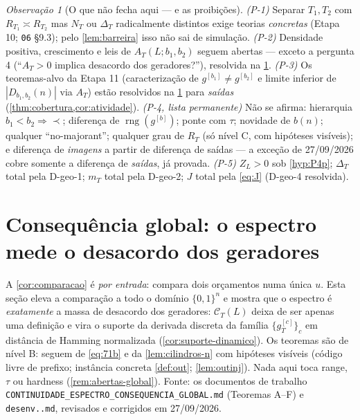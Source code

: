 \documentclass[11pt,a4paper]{article}
\theoremstyle{definition}
\theoremstyle{remark}
\newtheorem*{remark}{Observação}
\begin{document}
\begin{remark}[O que não fecha aqui --- e as proibições]\label{rem:abertas-geom}
\emph{(P-1)} Separar $T_1, T_2$ com $R_{T_1} \asymp R_{T_2}$ mas $N_T$
ou $\Delta_T$ radicalmente distintos exige teorias \emph{concretas}
(Etapa 10; \texttt{06} §9.3); pelo \cref{lem:barreira} isso não sai de
simulação. \emph{(P-2)} Densidade positiva, crescimento e leis de
$A_T(L;b_1,b_2)$ seguem abertas --- exceto a pergunta 4 (``$A_T > 0$
implica desacordo dos geradores?''), resolvida na
\cref{sec:consequencia}. \emph{(P-3)} Os teoremas-alvo da Etapa 11
(caracterização de $g^{[b_1]} \neq g^{[b_2]}$ e limite inferior de
$|D_{b_1,b_2}(n)|$ via $A_T$) estão resolvidos na
\cref{sec:consequencia} para \emph{saídas}
(\cref{thm:cobertura,cor:atividade}). \emph{(P-4, lista permanente)}
Não se afirma: hierarquia $b_1 < b_2 \Rightarrow \prec$; diferença de
$\operatorname{rng}(g^{[b]})$; ponte com $\tau$; novidade de $b(n)$;
qualquer ``no-majorant''; qualquer grau de $R_T$ (só nível C, com
hipóteses visíveis); e diferença de \emph{imagens} a partir de
diferença de saídas --- a exceção de 27/09/2026 cobre somente a
diferença de \emph{saídas}, já provada. \emph{(P-5)} $Z_L > 0$ sob
\cref{hyp:P4p}; $\Delta_T$ total pela D-geo-1; $m_T$ total pela
D-geo-2; $J$ total pela \cref{eq:J} (D-geo-4 resolvida).
\end{remark}

\section{Consequência global: o espectro mede o desacordo dos geradores}\label{sec:consequencia}

A \cref{cor:comparacao} é \emph{por entrada}: compara dois orçamentos
numa única $u$. Esta seção eleva a comparação a todo o domínio
$\{0,1\}^n$ e mostra que o espectro é \emph{exatamente} a massa de
desacordo dos geradores: $\mathcal{C}_T(L)$ deixa de ser apenas uma
definição e vira o suporte da derivada discreta da família
$\{g_T^{[c]}\}_c$ em distância de Hamming normalizada
(\cref{cor:suporte-dinamico}). Os teoremas são de nível B: seguem de
\eqref{eq:71b} e da \cref{lem:cilindros-n} com hipóteses visíveis
(código livre de prefixo; instância concreta \cref{def:out};
\cref{lem:outinj}). Nada aqui toca range, $\tau$ ou hardness
(\cref{rem:abertas-global}). Fonte: os documentos de trabalho
\texttt{CONTINUIDADE\_ESPECTRO\_CONSEQUENCIA\_GLOBAL.md} (Teoremas
A--F) e \texttt{desenv..md}, revisados e corrigidos em 27/09/2026.
\end{document}
